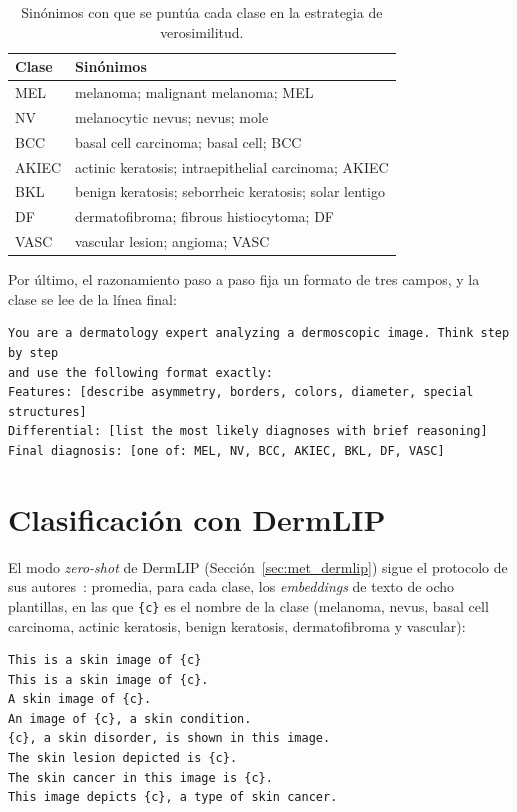 \begin{table}[H]
    \centering
    \caption{Sinónimos con que se puntúa cada clase en la estrategia de verosimilitud.}
    \label{tab:ap_sinonimos}
    \small
    \begin{tabularx}{\textwidth}{@{}>{\raggedright\arraybackslash}p{2.2cm}>{\raggedright\arraybackslash}X@{}}
        \toprule
        \textbf{Clase} & \textbf{Sinónimos} \\
        \midrule
        MEL & melanoma; malignant melanoma; MEL \\
        \filasep
        NV & melanocytic nevus; nevus; mole \\
        \filasep
        BCC & basal cell carcinoma; basal cell; BCC \\
        \filasep
        AKIEC & actinic keratosis; intraepithelial carcinoma; AKIEC \\
        \filasep
        BKL & benign keratosis; seborrheic keratosis; solar lentigo \\
        \filasep
        DF & dermatofibroma; fibrous histiocytoma; DF \\
        \filasep
        VASC & vascular lesion; angioma; VASC \\
        \bottomrule
    \end{tabularx}
\end{table}

Por último, el razonamiento paso a paso fija un formato de tres campos, y la clase se lee de la línea final:
\begin{verbatim}
You are a dermatology expert analyzing a dermoscopic image. Think step by step
and use the following format exactly:
Features: [describe asymmetry, borders, colors, diameter, special structures]
Differential: [list the most likely diagnoses with brief reasoning]
Final diagnosis: [one of: MEL, NV, BCC, AKIEC, BKL, DF, VASC]
\end{verbatim}

\section{Clasificación con DermLIP}

El modo \emph{zero-shot} de DermLIP (Sección~\ref{sec:met_dermlip}) sigue el protocolo de sus
autores~\cite{yan2025derm1miccv}: promedia, para cada clase, los \emph{embeddings} de texto de ocho plantillas, en las
que \texttt{\{c\}} es el nombre de la clase (melanoma, nevus, basal cell carcinoma, actinic keratosis, benign keratosis,
dermatofibroma y vascular):
\begin{verbatim}
This is a skin image of {c}
This is a skin image of {c}.
A skin image of {c}.
An image of {c}, a skin condition.
{c}, a skin disorder, is shown in this image.
The skin lesion depicted is {c}.
The skin cancer in this image is {c}.
This image depicts {c}, a type of skin cancer.
\end{verbatim}

